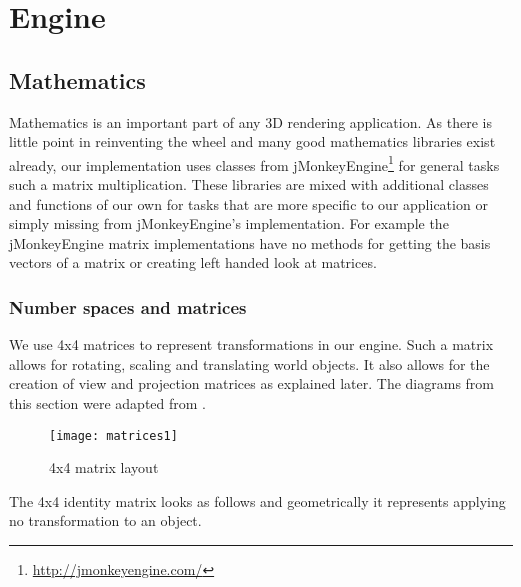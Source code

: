 \section{Engine}
\label{secengine}

\makeatletter
\newenvironment{myalign*}{%
\setlength{\mathindent}{0pt}%
\setlength{\abovedisplayskip}{-\baselineskip}%
\setlength{\abovedisplayshortskip}{\abovedisplayskip}%
\start@align\@ne\st@rredtrue\m@ne
}%
{\endalign}
\makeatother

\subsection{Mathematics}

Mathematics is an important part of any 3D rendering application. 
As there is little point in reinventing the wheel and many good mathematics libraries exist already, our implementation uses classes from 
jMonkeyEngine\footnote{\url{http://jmonkeyengine.com/}} for general tasks such a matrix multiplication. These libraries are mixed with additional classes and functions of our own for tasks that are more specific to our application
 or simply missing from jMonkeyEngine's implementation. For example the jMonkeyEngine matrix implementations have no methods for getting the basis vectors of a matrix or creating left handed look at matrices.

\subsubsection{Number spaces and matrices}
\label{numandmat}

We use 4x4 matrices to represent transformations in our engine. Such a matrix allows for rotating, scaling and translating world objects. It also allows for the creation of view and projection matrices as explained later. 
The diagrams from this section were adapted from \cite{matrixdiagref}.

\begin{figure}[!htbp]
  \begin{center}
    \leavevmode
    \ifpdf
      \texttt{[image: matrices1]}
    \fi
    \caption{4x4 matrix layout}
    \label{FigMatrices1}
  \end{center}
\end{figure}

\pagebreak
The 4x4 identity matrix looks as follows and geometrically it represents applying no transformation to an object.

